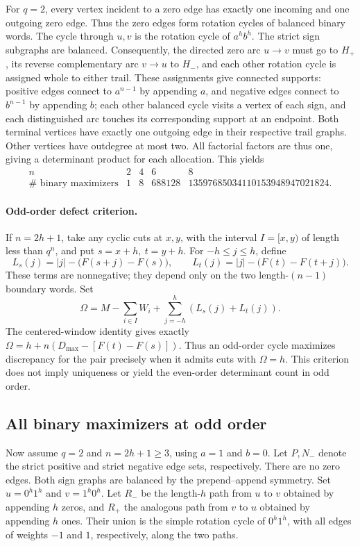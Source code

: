 \documentclass[11pt]{article}
\begin{document}
For \(q=2\), every vertex incident to a zero edge has exactly
one incoming and one outgoing zero edge. Thus the zero edges
form rotation cycles of balanced binary words. The cycle
through \(u,v\) is the rotation cycle of \(a^hb^h\).
The strict sign subgraphs are balanced. Consequently, the
directed zero arc \(u\to v\) must go to \(H_+\), its reverse
complementary arc \(v\to u\) to \(H_-\), and each other
rotation cycle is assigned whole to either trail. These
assignments give connected supports: positive edges connect
to \(a^{n-1}\) by appending \(a\), and negative edges connect
to \(b^{n-1}\) by appending \(b\); each other balanced cycle
visits a vertex of each sign, and each distinguished arc
touches its corresponding support at an endpoint. Both
terminal vertices have exactly one outgoing edge in their
respective trail graphs. Other vertices have outdegree at
most two. All factorial factors are thus one, giving a
determinant product for each allocation. This yields
\[
\begin{array}{c|rrrr}
 n&2&4&6&8\\ \hline
 \#\text{ binary maximizers}&1&8&688128&13597685034110153948947021824.
\end{array}
\]

\paragraph{Odd-order defect criterion.}
If \(n=2h+1\), take any cyclic cuts at \(x,y\), with the interval
\(I=[x,y)\) of length less than \(q^n\), and put \(s=x+h,\ t=y+h\).
For \(-h\le j\le h\), define
\[
 L_s(j)=|j|-\bigl(F(s+j)-F(s)\bigr),\qquad
 L_t(j)=|j|-\bigl(F(t)-F(t+j)\bigr).
\]
These terms are nonnegative; they depend only on the two
length-\((n-1)\) boundary words. Set
\[
 \Omega=M-\sum_{i\in I}W_i+\sum_{j=-h}^{h}(L_s(j)+L_t(j)).
\]
The centered-window identity gives exactly
\(\Omega=h+n(D_{\max}-[F(t)-F(s)])\). Thus an odd-order cycle
maximizes discrepancy for the pair precisely when it admits
cuts with \(\Omega=h\). This criterion does not imply uniqueness
or yield the even-order determinant count in odd order.

\subsection{All binary maximizers at odd order}
Now assume \(q=2\) and \(n=2h+1\ge3\), using \(a=1\) and \(b=0\).
Let \(P,N_-\) denote the strict positive and strict negative edge
sets, respectively. There are no zero edges. Both sign graphs
are balanced by the prepend--append symmetry.
Set \(u=0^h1^h\) and \(v=1^h0^h\). Let \(R_-\) be the
length-\(h\) path from \(u\) to \(v\) obtained by appending
\(h\) zeros, and \(R_+\) the analogous path from \(v\) to \(u\)
obtained by appending \(h\) ones. Their union is the simple
rotation cycle of \(0^h1^h\), with all edges of weights
\(-1\) and \(1\), respectively, along the two paths.
\end{document}
